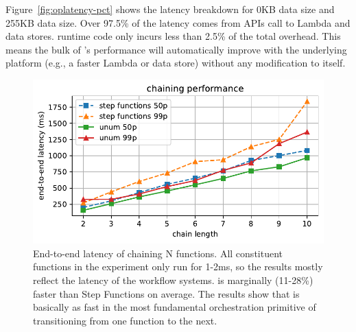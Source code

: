Figure~\ref{fig:oplatency-pct} shows the latency breakdown for 0KB data size
and 255KB data size. Over 97.5\% of the latency comes from APIs call to Lambda
and data stores. \name{} runtime code only incurs less than 2.5\% of the total
overhead. This means the bulk of \name{}'s performance will automatically
improve with the underlying platform (e.g., a faster Lambda or data store)
without any modification to \name{} itself.

\begin{figure}[t!]
    \centering
    \includegraphics[width=\columnwidth]{figures/ChainMicroLatency.pdf}
    \caption{End-to-end latency of chaining N functions. All constituent
    functions in the experiment only run for 1-2ms, so the results mostly
    reflect the latency of the workflow systems. \name{} is marginally
    (11-28\%) faster than Step Functions on average. The results show that
    \name{} is basically as fast in the most fundamental orchestration
    primitive of transitioning from one function to the next.}
    \label{fig:chainmicrolatency}
\end{figure}

